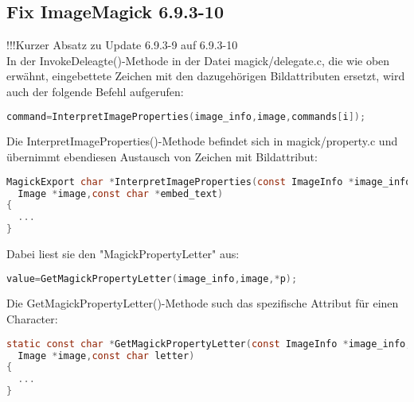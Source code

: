 \subsection{Fix ImageMagick 6.9.3-10}\label{subsec:fix-imagemagick-6.9.3-10}

!!!Kurzer Absatz zu Update 6.9.3-9 auf 6.9.3-10\\

In der InvokeDeleagte()-Methode in der Datei magick/delegate.c, die wie oben erwähnt, eingebettete Zeichen mit den dazugehörigen Bildattributen ersetzt, wird auch der folgende Befehl aufgerufen:\\

\begin{lstlisting}[firstnumber=1295, language=C, caption=magick/delegate.c Aufruf InterpretImageProperties(),label={lst:lstlisting}]
command=InterpretImageProperties(image_info,image,commands[i]);
\end{lstlisting}
\vspace{5mm}

Die InterpretImageProperties()-Methode befindet sich in magick/property.c und übernimmt ebendiesen Austausch von Zeichen mit Bildattribut:\\

\begin{lstlisting}[firstnumber=3347, language=C, caption=magick/property.c InterpretImageProperties(),label={lst:lstlisting}]
MagickExport char *InterpretImageProperties(const ImageInfo *image_info,
  Image *image,const char *embed_text)
{
  ...
}
\end{lstlisting}
\vspace{5mm}

Dabei liest sie den "MagickPropertyLetter" aus:\\

\begin{lstlisting}[firstnumber=3466, language=C, caption=magick/property.c Aufruf GetMagickPropertyLetter(),label={lst:lstlisting}]
  value=GetMagickPropertyLetter(image_info,image,*p);
\end{lstlisting}
\vspace{5mm}

Die GetMagickPropertyLetter()-Methode such das spezifische Attribut für einen Character:\\

\begin{lstlisting}[firstnumber=2343, language=C, caption=magick/property.c GetMagickPropertyLetter(),label={lst:lstlisting}]
static const char *GetMagickPropertyLetter(const ImageInfo *image_info,
  Image *image,const char letter)
{
  ...
}
\end{lstlisting}
\vspace{5mm}

